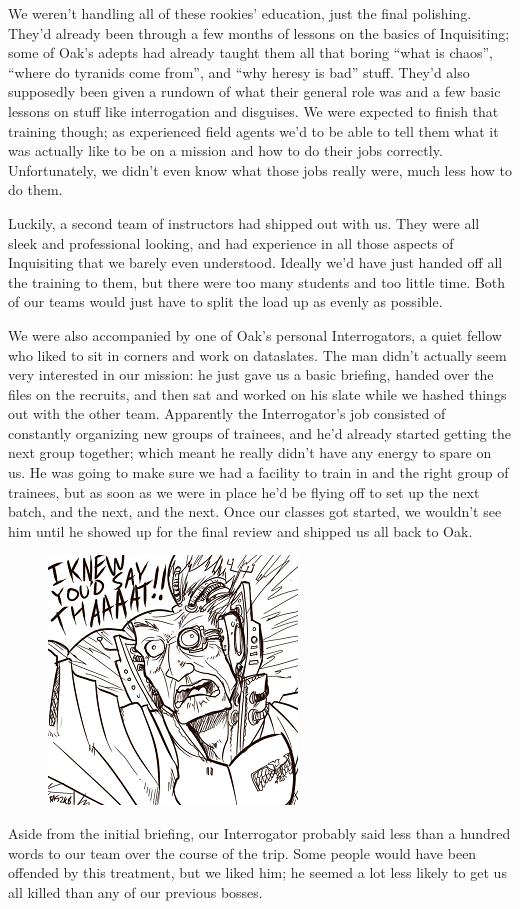 We weren’t handling all of these rookies’ education, just the final polishing. 
They’d already been through a few months of lessons on the basics of Inquisiting; 
some of Oak’s adepts had already taught them all that boring “what is chaos”, “where do tyranids come from”, and “why heresy is bad” stuff. 
They’d also supposedly been given a rundown of what their general role was and a few basic lessons on stuff like interrogation and disguises. 
We were expected to finish that training though; 
as experienced field agents we’d to be able to tell them what it was actually like to be on a mission and how to do their jobs correctly. 
Unfortunately, we didn’t even know what those jobs really were, much less how to do them.

Luckily, a second team of instructors had shipped out with us. 
They were all sleek and professional looking, and had experience in all those aspects of Inquisiting that we barely even understood. 
Ideally we’d have just handed off all the training to them, but there were too many students and too little time. 
Both of our teams would just have to split the load up as evenly as possible.

We were also accompanied by one of Oak’s personal Interrogators, a quiet fellow who liked to sit in corners and work on dataslates. 
The man didn’t actually seem very interested in our mission: 
he just gave us a basic briefing, handed over the files on the recruits, and then sat and worked on his slate while we hashed things out with the other team. 
Apparently the Interrogator’s job consisted of constantly organizing new groups of trainees, and he’d already started getting the next group together; 
which meant he really didn’t have any energy to spare on us. 
He was going to make sure we had a facility to train in and the right group of trainees, but as soon as we were in place he’d be flying off to set up the next batch, and the next, and the next. 
Once our classes got started, we wouldn’t see him until he showed up for the final review and shipped us all back to Oak.

\begin{figure}
	\begin{center}
		\includegraphics[width=\figwidth]{pics/8/5.png}
	\end{center}
\end{figure}
Aside from the initial briefing, our Interrogator probably said less than a hundred words to our team over the course of the trip. 
Some people would have been offended by this treatment, but we liked him; 
he seemed a lot less likely to get us all killed than any of our previous bosses.


